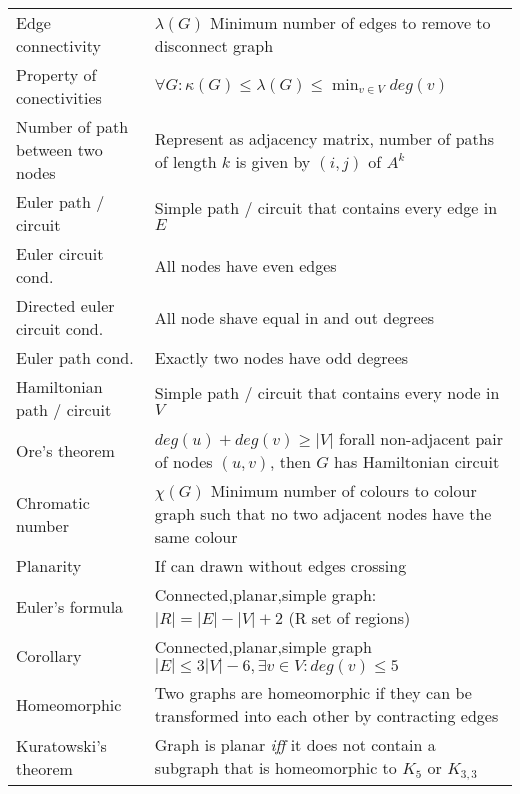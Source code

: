 \documentclass[a4paper,landscape]{article}
\begin{document}
\begin{multicols*}{2}
\begin{tabularx}{\columnwidth}{@{}lX@{}}
        Edge connectivity                & $\lambda(G)$ Minimum number of edges to remove to disconnect graph                                       \\
        Property of conectivities        & $\forall G : \kappa(G) \leq \lambda(G) \leq \min_{v \in V} deg(v)$                                       \\
        Number of path between two nodes & Represent as adjacency matrix, number of paths of length $k$ is given by $(i,j)$ of $A^k$                \\
        Euler path / circuit             & Simple path / circuit that contains every edge in $E$                                                    \\
        Euler circuit cond.              & All nodes have even edges                                                                                \\
        Directed euler circuit cond.     & All node shave equal in and out degrees                                                                  \\
        Euler path cond.                 & Exactly two nodes have odd degrees                                                                       \\
        Hamiltonian path / circuit       & Simple path / circuit that contains every node in $V$                                                    \\
        Ore's theorem                    & $deg(u) + deg(v) \geq |V|$ forall non-adjacent pair of nodes $(u,v)$, then $G$ has Hamiltonian circuit   \\
        Chromatic number                 & $\chi(G)$ Minimum number of colours to colour graph such that no two adjacent nodes have the same colour \\
        Planarity                        & If can drawn without edges crossing                                                                      \\
        Euler's formula                  & Connected,planar,simple graph: $|R|=|E|-|V|+2$ (R set of regions)                                        \\
        Corollary                        & Connected,planar,simple graph $|E| \leq 3|V| - 6, \exists v \in V : deg(v) \leq 5$                       \\
        Homeomorphic                     & Two graphs are homeomorphic if they can be transformed into each other by contracting edges              \\
        Kuratowski's theorem             & Graph is planar \textit{iff} it does not contain a subgraph that is homeomorphic to $K_5$ or $K_{3,3}$   \\
    \end{tabularx}
\end{multicols*}
\end{document}
